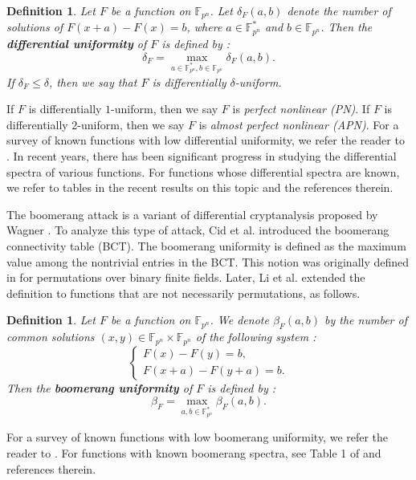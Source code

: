 \documentclass[11pt]{article}
\numberwithin{theorem}{section}
\newtheorem{defi}[theorem]{Definition}
\newcommand{\Max}{\displaystyle \max}
\newcommand{\Fpn}{\mathbb{F}_{p^n}}
\newcommand{\Fpnmul}{\mathbb{F}_{p^n}^*}
\begin{document}
\begin{defi}
	Let $F$ be a function on $\Fpn$. Let $\delta_F(a,b)$ denote the number of solutions of $F(x+a)-F(x)=b$, where $a\in \Fpnmul$ and $b\in \Fpn$. Then the \textbf{differential uniformity} of $F$ is defined by :
	\begin{equation*}
		\delta_F = \Max_{a\in \Fpnmul, b\in \Fpn}\delta_F(a,b).
	\end{equation*}
	If $\delta_F\le \delta$, then we say that $F$ is differentially $\delta$-uniform. 
\end{defi}
If $F$ is differentially $1$-uniform, then we say $F$ is \emph{perfect nonlinear (PN)}. If $F$ is differentially $2$-uniform, then we say $F$ is \emph{almost perfect nonlinear (APN)}. For a survey of known functions with low differential uniformity, we refer the reader to \cite{Car21}. In recent years, there has been significant progress in studying the differential spectra of various functions. For functions whose differential spectra are known, we refer to tables in the recent results on this topic \cite{MW25,RXY24,XBC+24} and the references therein.

The boomerang attack is a variant of differential cryptanalysis proposed by Wagner \cite{Wag99}. To analyze this type of attack, Cid et al. \cite{CHP+18} introduced the boomerang connectivity table (BCT). The boomerang uniformity is defined as the maximum value among the nontrivial entries in the BCT. This notion was originally defined in \cite{CHP+18} for permutations over binary finite fields. Later, Li et al. \cite{LQSL19} extended the definition to functions that are not necessarily permutations, as follows.

\begin{defi}
	Let $F$ be a function on $\Fpn$. We denote $\beta_F(a,b)$ by the number of common solutions $(x,y)\in \Fpn \times \Fpn$ of the following system :
	\begin{equation*}
		\begin{cases}
			F(x)-F(y)=b,\\
			F(x+a)-F(y+a)=b.
		\end{cases}
	\end{equation*}
	Then the \textbf{boomerang uniformity} of $F$ is defined by :
	\begin{equation*}
		\beta_F = \Max_{a,b\in \Fpnmul}\beta_F(a,b).
	\end{equation*} 
	
\end{defi}
For a survey of known functions with low boomerang uniformity, we refer the reader to \cite{MMM22}. For functions with known boomerang spectra, see Table 1 of \cite{LWZ24} and references therein. 
\end{document}
